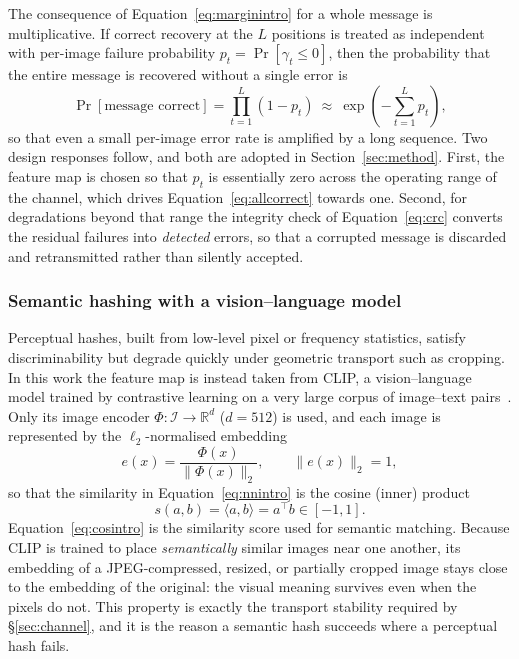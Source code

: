 \documentclass[10pt,a4paper]{article}
\theoremstyle{definition}
\begin{document}
The consequence of Equation~\eqref{eq:marginintro} for a whole message is multiplicative. If
correct recovery at the $L$ positions is treated as independent with per-image
failure probability $p_t=\Pr[\gamma_t\le 0]$, then the probability that the entire
message is recovered without a single error is
\begin{equation}
  \Pr[\text{message correct}]=\prod_{t=1}^{L}\left(1-p_t\right)
     \ \approx\ \exp\!\left(-\sum_{t=1}^{L} p_t\right),
  \label{eq:allcorrect}
\end{equation}
so that even a small per-image error rate is amplified by a long sequence. Two
design responses follow, and both are adopted in Section~\ref{sec:method}. First,
the feature map is chosen so that $p_t$ is essentially zero across the operating
range of the channel, which drives Equation~\eqref{eq:allcorrect} towards one. Second, for
degradations beyond that range the integrity check of Equation~\eqref{eq:crc} converts the
residual failures into \emph{detected} errors, so that a corrupted message is
discarded and retransmitted rather than silently accepted.

\subsubsection{Semantic hashing with a vision--language model}\label{sec:clip}
Perceptual hashes, built from low-level pixel or frequency statistics, satisfy
discriminability but degrade quickly under geometric transport such as cropping.
In this work the feature map is instead taken from CLIP, a vision--language model
trained by contrastive learning on a very large corpus of image--text
pairs~\cite{radford2021}. Only its image encoder $\Phi:\mathcal{I}\to\mathbb{R}^d$
($d=512$) is used, and each image is represented by the $\ell_2$-normalised
embedding
\begin{equation}
  e(x)=\frac{\Phi(x)}{\lVert\Phi(x)\rVert_2},\qquad \lVert e(x)\rVert_2=1 ,
  \label{eq:embedintro}
\end{equation}
so that the similarity in Equation~\eqref{eq:nnintro} is the cosine (inner) product
\begin{equation}
  s(a,b)=\langle a,b\rangle = a^{\!\top}b\in[-1,1].
  \label{eq:cosintro}
\end{equation}
Equation~\eqref{eq:cosintro} is the similarity score used for semantic matching.
Because CLIP is trained to place \emph{semantically} similar images near one
another, its embedding of a JPEG-compressed, resized, or partially cropped image
stays close to the embedding of the original: the visual meaning survives even
when the pixels do not. This property is exactly the transport stability required
by \S\ref{sec:channel}, and it is the reason a semantic hash succeeds where a
perceptual hash fails.
\end{document}
